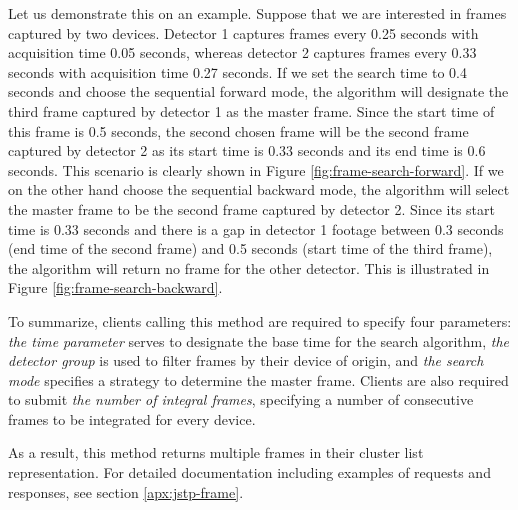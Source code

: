 Let us demonstrate this on an example. Suppose that we are interested in frames captured by two devices. Detector 1 captures frames every 0.25 seconds with acquisition time 0.05 seconds, whereas detector 2 captures frames every 0.33 seconds with acquisition time 0.27 seconds. If we set the search time to 0.4 seconds and choose the sequential forward mode, the algorithm will designate the third frame captured by detector 1 as the master frame. Since the start time of this frame is 0.5 seconds, the second chosen frame will be the second frame captured by detector 2 as its start time is 0.33 seconds and its end time is 0.6 seconds. This scenario is clearly shown in Figure \ref{fig:frame-search-forward}. If we on the other hand choose the sequential backward mode, the algorithm will select the master frame to be the second frame captured by detector 2. Since its start time is 0.33 seconds and there is a gap in detector 1 footage between 0.3 seconds (end time of the second frame) and 0.5 seconds (start time of the third frame), the algorithm will return no frame for the other detector. This is illustrated in Figure \ref{fig:frame-search-backward}.


To summarize, clients calling this method are required to specify four parameters: \textit{the time parameter} serves to designate the base time for the search algorithm, \textit{the detector group} is used to filter frames by their device of origin, and \textit{the search mode} specifies a strategy to determine the master frame. Clients are also required to submit \textit{the number of integral frames}, specifying a number of consecutive frames to be integrated for every device.

As a result, this method returns multiple frames in their cluster list representation. For detailed documentation including examples of requests and responses, see section \ref{apx:jstp-frame}.

